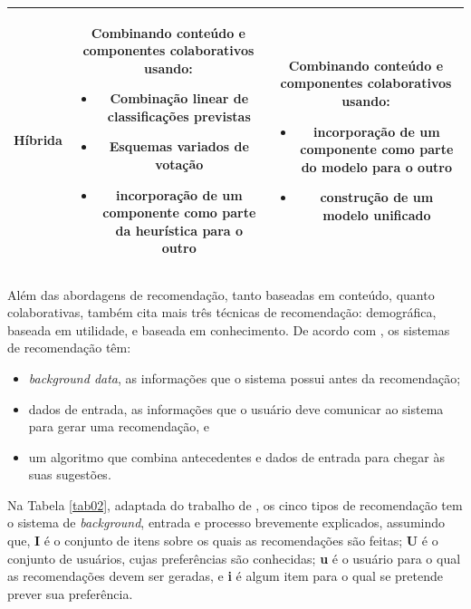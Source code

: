 \begin{table}[]
\begin{tabular}{|c|c|c|}
	\textbf{Híbrida} &  \begin{minipage} [t] {0.3\textwidth} Combinando conteúdo e componentes colaborativos usando: \begin{itemize} \item Combinação linear de classificações previstas \item Esquemas variados de votação \item incorporação de um componente como parte da heurística para o outro \end{itemize}        \end{minipage} & \begin{minipage} [t] {0.3\textwidth} Combinando conteúdo e componentes colaborativos usando: \begin{itemize} \item incorporação de um componente como parte do modelo para o outro \item construção de um modelo unificado \end{itemize} \end{minipage} \\ \hline
	\end{tabular}
\end{table}

Além das abordagens de recomendação, tanto baseadas em conteúdo, quanto colaborativas,  também cita mais três técnicas de recomendação: demográfica, baseada em utilidade, e 
baseada em conhecimento. De acordo com , os sistemas de recomendação têm: 

\begin{itemize}

	\item \emph{background data}, as informações que o sistema possui antes da recomendação;

	\item dados de entrada, as informações que o usuário deve comunicar ao
	sistema para gerar uma recomendação, e

	\item um algoritmo que combina antecedentes e dados de entrada para chegar às suas sugestões.

\end{itemize}

Na Tabela \ref{tab02}, adaptada do trabalho de , os cinco tipos de 
recomendação tem o sistema de \emph{background}, entrada e processo brevemente explicados, 
assumindo que, \textbf{I} é o conjunto de itens sobre os quais as recomendações são feitas; \textbf{U} é o conjunto de usuários, cujas preferências são conhecidas; \textbf{u} 
é o usuário para o qual as recomendações devem ser geradas, e \textbf{i} é algum item para o qual se pretende prever sua preferência.

